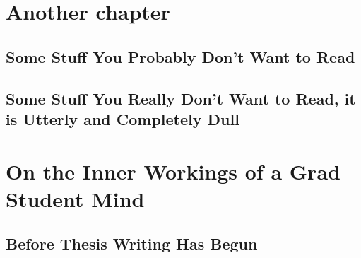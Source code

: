 \documentclass[10pt,chapterheads]{ucsd}
\begin{document}
\chapter{Another chapter}
\section{Some Stuff You Probably Don't Want to Read}
\section{Some Stuff You Really Don't Want to Read, it is Utterly and Completely Dull}


\chapter{On the Inner Workings of a Grad Student Mind}
\section{Before Thesis Writing Has Begun}
\end{document}
